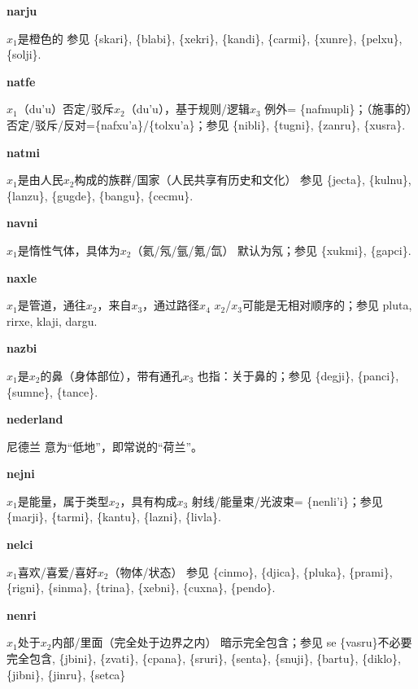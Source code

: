 \documentclass[notitlepage,twocolumn,a4paper,10pt]{book}
\begin{document}
{\sffamily\bfseries narju}\enspace {\ttfamily\bfseries[naj]}  $x_1$是橙色的 \textemdash{} 参见 \{skari\}, \{blabi\}, \{xekri\}, \{kandi\}, \{carmi\}, \{xunre\}, \{pelxu\}, \{solji\}.

{\sffamily\bfseries natfe}\enspace {\ttfamily\bfseries[naf     na'e]}  $x_1$（du'u）否定\slash{}驳斥$x_2$（du'u），基于规则\slash{}逻辑$x_3$ \textemdash{} 例外= \{nafmupli\}；（施事的）否定\slash{}驳斥\slash{}反对=\{nafxu'a\}\slash{}\{tolxu'a\}；参见 \{nibli\}, \{tugni\}, \{zanru\}, \{xusra\}.

{\sffamily\bfseries natmi}  $x_1$是由人民$x_2$构成的族群\slash{}国家（人民共享有历史和文化） \textemdash{} 参见 \{jecta\}, \{kulnu\}, \{lanzu\}, \{gugde\}, \{bangu\}, \{cecmu\}.

{\sffamily\bfseries navni} $x_1$是惰性气体，具体为$x_2$（氦\slash{}氖\slash{}氩\slash{}氪\slash{}氙） \textemdash{} 默认为氖；参见 \{xukmi\}, \{gapci\}.

{\sffamily\bfseries naxle}  $x_1$是管道，通往$x_2$，来自$x_3$，通过路径$x_4$ \textemdash{} $x_2$\slash{}$x_3$可能是无相对顺序的；参见 {pluta}, {rirxe}, {klaji}, {dargu}.

{\sffamily\bfseries nazbi}  $x_1$是$x_2$的鼻（身体部位），带有通孔$x_3$ \textemdash{} 也指：关于鼻的；参见 \{degji\}, \{panci\}, \{sumne\}, \{tance\}.

{\sffamily\bfseries nederland} 尼德兰 \textemdash{} 意为“低地”，即常说的“荷兰”。

{\sffamily\bfseries nejni}\enspace {\ttfamily\bfseries[nen]}  $x_1$是能量，属于类型$x_2$，具有构成$x_3$ \textemdash{} 射线\slash{}能量束\slash{}光波束= \{nenli'i\}；参见 \{marji\}, \{tarmi\}, \{kantu\}, \{lazni\}, \{livla\}.

{\sffamily\bfseries nelci}  $x_1$喜欢\slash{}喜爱\slash{}喜好$x_2$（物体\slash{}状态） \textemdash{} 参见 \{cinmo\}, \{djica\}, \{pluka\}, \{prami\}, \{rigni\}, \{sinma\}, \{trina\}, \{xebni\}, \{cuxna\}, \{pendo\}.

{\sffamily\bfseries nenri}\enspace {\ttfamily\bfseries[ner     ne'i]}  $x_1$处于$x_2$内部\slash{}里面（完全处于边界之内） \textemdash{} 暗示完全包含；参见 se \{vasru\}不必要完全包含, \{jbini\}, \{zvati\}, \{cpana\}, \{sruri\}, \{senta\}, \{snuji\}, \{bartu\}, \{diklo\}, \{jibni\}, \{jinru\}, \{setca\}
\end{document}
